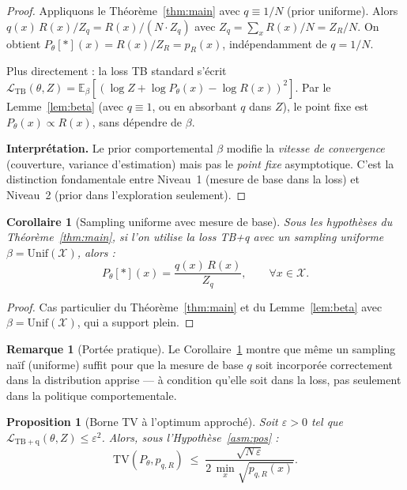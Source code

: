 \documentclass[11pt,a4paper]{article}
\theoremstyle{plain}
\newtheorem{corollary}[theorem]{Corollaire}
\newtheorem{proposition}[theorem]{Proposition}
\theoremstyle{definition}
\newtheorem{remark}[theorem]{Remarque}
\theoremstyle{remark}
\newcommand{\E}{\mathbb{E}}
\newcommand{\calX}{\mathcal{X}}
\newcommand{\calL}{\mathcal{L}}
\newcommand{\logZ}{\log Z}
\newcommand{\pth}{P_\theta}
\newcommand{\pR}{p_R}
\newcommand{\TV}{\mathrm{TV}}
\begin{document}
\begin{proof}
Appliquons le Théorème~\ref{thm:main} avec $q \equiv 1/N$ (prior uniforme).
Alors $q(x)\,R(x)/Z_q = R(x)/(N \cdot Z_q)$ avec $Z_q = \sum_x R(x)/N = Z_R/N$.
On obtient $\pth[*](x) = R(x)/Z_R = \pR(x)$, indépendamment de $q = 1/N$.

Plus directement : la loss TB standard s'écrit $\calL_{\mathrm{TB}}(\theta,Z)
= \E_\beta[(\logZ + \log\pth(x) - \log R(x))^2]$.
Par le Lemme~\ref{lem:beta} (avec $q \equiv 1$, ou en absorbant $q$ dans $Z$),
le point fixe est $\pth(x) \propto R(x)$, sans dépendre de $\beta$.

\textbf{Interprétation.}
Le prior comportemental $\beta$ modifie la \emph{vitesse de convergence}
(couverture, variance d'estimation) mais pas le \emph{point fixe} asymptotique.
C'est la distinction fondamentale entre Niveau~1 (mesure de base dans la loss)
et Niveau~2 (prior dans l'exploration seulement).
\end{proof}

\begin{corrbox}
\begin{corollary}[Sampling uniforme avec mesure de base]
\label{cor:uniform}
Sous les hypothèses du Théorème~\ref{thm:main}, si l'on utilise la loss TB+q
avec un sampling uniforme $\beta = \mathrm{Unif}(\calX)$, alors :
\begin{equation}
  \pth[*](x) = \frac{q(x)\,R(x)}{Z_q}, \qquad \forall x \in \calX.
\end{equation}
\end{corollary}
\end{corrbox}

\begin{proof}
Cas particulier du Théorème~\ref{thm:main} et du Lemme~\ref{lem:beta}
avec $\beta = \mathrm{Unif}(\calX)$, qui a support plein.
\end{proof}

\begin{remark}[Portée pratique]
Le Corollaire~\ref{cor:uniform} montre que même un sampling naïf (uniforme)
suffit pour que la mesure de base $q$ soit incorporée correctement dans la
distribution apprise — à condition qu'elle soit dans la loss, pas seulement
dans la politique comportementale.
\end{remark}

\begin{proposition}[Borne TV à l'optimum approché]
\label{prop:tv}
Soit $\varepsilon > 0$ tel que $\calL_{\mathrm{TB+q}}(\theta, Z) \leq \varepsilon^2$.
Alors, sous l'Hypothèse~\ref{asm:pos} :
\begin{equation}
  \TV(\pth, p_{q,R})
  \;\leq\;
  \frac{\sqrt{N\,\varepsilon}}{2\,\min_x \sqrt{p_{q,R}(x)}}.
\end{equation}
\end{proposition}
\end{document}
